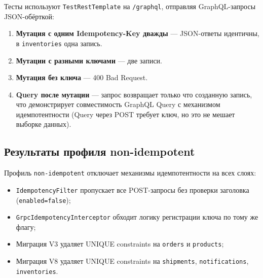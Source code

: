 Тесты используют \texttt{TestRestTemplate} на \texttt{/graphql}, отправляя GraphQL-запросы JSON-обёрткой:
\begin{enumerate}
    \item \textbf{Мутация с одним Idempotency-Key дважды} --- JSON-ответы идентичны, в \texttt{inventories} одна запись.
    \item \textbf{Мутации с разными ключами} --- две записи.
    \item \textbf{Мутация без ключа} --- 400 Bad Request.
    \item \textbf{Query после мутации} --- запрос возвращает только что созданную запись, что демонстрирует совместимость GraphQL Query с механизмом идемпотентности (Query через POST требует ключ, но это не мешает выборке данных).
\end{enumerate}

\subsection{Результаты профиля non-idempotent}

Профиль \texttt{non-idempotent} отключает механизмы идемпотентности на всех слоях:
\begin{itemize}
    \item \texttt{IdempotencyFilter} пропускает все POST-запросы без проверки заголовка (\texttt{enabled=false});
    \item \texttt{GrpcIdempotencyInterceptor} обходит логику регистрации ключа по тому же флагу;
    \item Миграция V3 удаляет UNIQUE constraints на \texttt{orders} и \texttt{products};
    \item Миграция V8 удаляет UNIQUE constraints на \texttt{shipments}, \texttt{notifications}, \texttt{inventories}.
\end{itemize}

